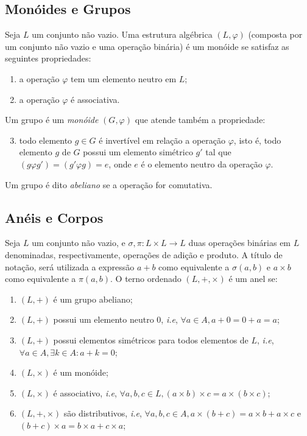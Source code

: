 %
%
\subsection{Monóides e Grupos}
Seja \(L\) um conjunto não vazio. Uma estrutura algébrica \((L, \varphi )\) (composta por um conjunto não vazio e uma operação binária) é um monóide se satisfaz as seguintes propriedades:

\begin{enumerate}
  \item a operação \( \varphi \) tem um elemento neutro em \(L\);
  \item a operação \( \varphi \) é associativa.
\end{enumerate}

Um grupo é um \textit{monóide} \((G,  \varphi)\) que atende também a propriedade:
\begin{enumerate}
\setcounter{enumi}{2}
\item todo elemento \(g \in G\) é invertível em relação a operação \(\varphi\), isto é, todo elemento \(g\) de \(G\) possui um elemento simétrico \(g'\) tal que \((g \varphi g') = (g' \varphi g) = e \), onde \(e\) é o elemento neutro da operação \(\varphi\).
\end{enumerate}
Um grupo é dito \textit{abeliano} se a operação for comutativa.

%
%
\subsection{Anéis e Corpos}
 Seja \(L\) um conjunto não vazio, e \(\sigma, \pi:L \times L \to L\) duas operações binárias em \(L\) denominadas, respectivamente, operações de adição e produto. A título de notação, será utilizada a expressão \(a+b\) como equivalente a \(\sigma(a,b)\) e \(a \times b\) como equivalente a \(\pi(a,b)\). O terno ordenado \((L, +,\times )\) é um anel se:
\begin{enumerate}
  \item \((L, +)\) é um grupo abeliano;
  \item \((L, +)\) possui um elemento neutro $0$, \textit{i.e}, \(\forall a \in A, a + 0 = 0 + a = a\);
  \item \((L, +)\) possui elementos simétricos para todos elementos de $L$, \textit{i.e}, \(\forall a \in A, \exists k \in A: a + k = 0\);
  \item \((L, \times)\) é um monóide;
  \item \((L, \times)\) é associativo, \textit{i.e}, \(\forall a,b,c \in L, (a \times b) \times c = a \times (b \times c)\);
  \item \((L, +, \times)\) são distributivos, \textit{i.e}, \(\forall a,b,c \in A, a \times (b + c) = a \times b + a \times c\) e \((b + c) \times a = b \times a + c \times a\);
\end{enumerate}

